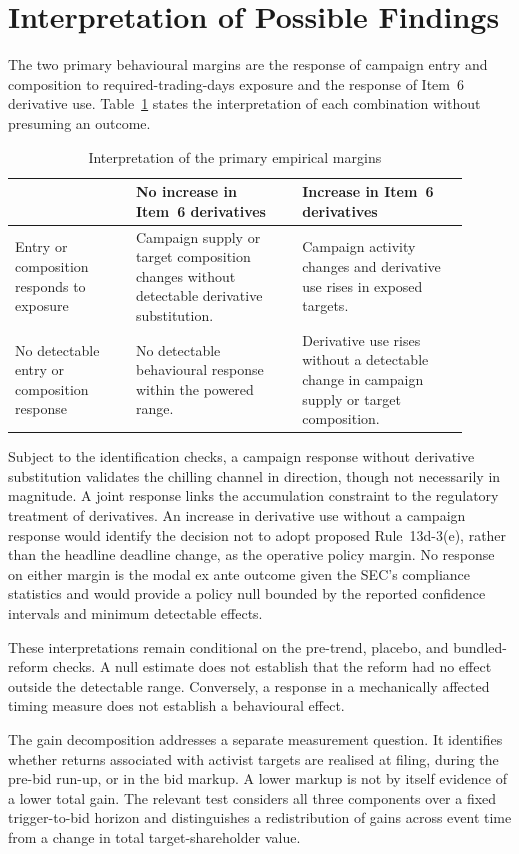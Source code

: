 \section{Interpretation of Possible Findings}
\label{sec:interpretation}

The two primary behavioural margins are the response of campaign entry and
composition to required-trading-days exposure and the response of Item~6
derivative use. Table~\ref{tab:findings} states the interpretation of each
combination without presuming an outcome.

\begin{table}[htbp]
\centering
\small
\caption{Interpretation of the primary empirical margins}
\label{tab:findings}
\begin{tabular}{@{}p{0.24\linewidth}p{0.33\linewidth}p{0.33\linewidth}@{}}
\toprule
& No increase in Item~6 derivatives & Increase in Item~6 derivatives \\
\midrule
Entry or composition responds to exposure
& Campaign supply or target composition changes without detectable derivative
substitution.
& Campaign activity changes and derivative use rises in exposed targets. \\
No detectable entry or composition response
& No detectable behavioural response within the powered range.
& Derivative use rises without a detectable change in campaign supply or target
composition. \\
\bottomrule
\end{tabular}
\end{table}

Subject to the identification checks, a campaign response without derivative
substitution validates the chilling channel in direction, though not
necessarily in magnitude. A joint response links the accumulation constraint
to the regulatory treatment of derivatives. An increase in derivative use
without a campaign response would identify the decision not to adopt proposed
Rule~13d-3(e), rather than the headline deadline change, as the operative policy
margin. No response on either margin is the modal ex ante outcome given the
SEC's compliance statistics and would provide a policy null bounded by the
reported confidence intervals and minimum detectable effects.

These interpretations remain conditional on the pre-trend, placebo, and
bundled-reform checks. A null estimate does not establish that the reform had no
effect outside the detectable range. Conversely, a response in a mechanically
affected timing measure does not establish a behavioural effect.

The gain decomposition addresses a separate measurement question. It identifies
whether returns associated with activist targets are realised at filing, during
the pre-bid run-up, or in the bid markup. A lower markup is not by itself
evidence of a lower total gain. The relevant test considers all three components
over a fixed trigger-to-bid horizon and distinguishes a redistribution of gains
across event time from a change in total target-shareholder value.
